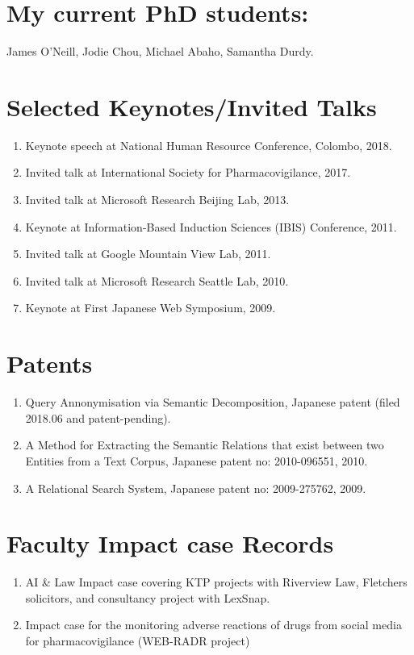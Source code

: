 \documentclass[a4paper,11pt]{article}
\begin{document}
\section{My current PhD students:}
 James O'Neill, Jodie Chou, Michael Abaho, Samantha Durdy.





\section{Selected Keynotes/Invited Talks}
\begin{enumerate}
\item Keynote speech at National Human Resource Conference, Colombo, 2018.
\item Invited talk at International Society for Pharmacovigilance, 2017.
\item Invited talk at Microsoft Research Beijing Lab, 2013.
\item Keynote at Information-Based Induction Sciences (IBIS) Conference, 2011.
\item Invited talk at Google Mountain View Lab, 2011.
\item Invited talk at Microsoft Research Seattle Lab, 2010.
\item Keynote at First Japanese Web Symposium, 2009.
\end{enumerate}


\section{Patents}
\begin{enumerate}
\item Query Annonymisation via Semantic Decomposition, Japanese patent (filed 2018.06 and patent-pending).
\item A Method for Extracting the Semantic Relations that exist between two Entities from a Text Corpus, Japanese patent no: 2010-096551, 2010.
\item A Relational Search System, Japanese patent no: 2009-275762, 2009.
\end{enumerate}

\section{Faculty Impact case Records}
\begin{enumerate}
\item AI \& Law Impact case covering KTP projects with Riverview Law, Fletchers solicitors, and consultancy project with LexSnap.
\item Impact case for the monitoring adverse reactions of drugs from social media for pharmacovigilance (WEB-RADR project)
\end{enumerate}
\end{document}
